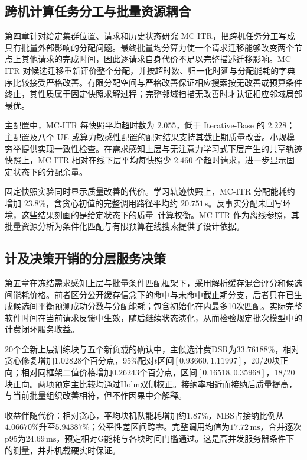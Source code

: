 \subsection{跨机计算任务分工与批量资源耦合}
\label{sec:ch6-snapshot-summary}

第四章针对给定集群位置、请求和历史状态研究 MC-ITR，把跨机任务分工写成具有批量外部影响的分配问题。最终批量均分算力使一个请求迁移能够改变两个节点上其他请求的完成时间，因此逐请求自身代价不足以完整描述迁移影响。MC-ITR 对候选迁移重新评价整个分配，并按超时数、归一化时延与分配能耗的字典序比较接受严格改善。有限分配空间与严格改善保证相应搜索按无改善或预算条件终止，其性质属于固定快照求解过程；完整邻域扫描无改善时才认证相应邻域局部最优。

主配置中，MC-ITR 每快照平均超时数为 $2.055$，低于 Iterative-Base 的 $2.228$；主配置及八个 UE 或算力敏感性配置的配对结果支持其截止期质量改善。小规模穷举提供实现一致性检查。在需求感知上层与无注意力学习式下层产生的共享轨迹快照上，MC-ITR 相对在线下层平均每快照少 $2.460$ 个超时请求，进一步显示固定状态下的分配余量。

固定快照实验同时显示质量改善的代价。学习轨迹快照上，MC-ITR 分配能耗约增加 $23.8\%$，含贪心初值的完整调用路径平均约 $20.751\,\mathrm{s}$。反事实分配未回写环境，这些结果刻画的是给定状态下的质量--计算权衡。MC-ITR 作为离线参照，其批量资源分析为条件化匹配与有限预算在线搜索提供了设计依据。

\subsection{计及决策开销的分层服务决策}
\label{sec:ch6-sfhlm-summary}
第五章在冻结需求感知上层与批量条件匹配框架下，采用解析缓存混合评分和候选间能耗价格。前者区分公开缓存信念下的命中与未命中截止期分支，后者只在已生成候选间平衡预测成功分数与分配能耗；包含初始化在内最多10次匹配。实际完整软件时间在当前请求反馈中生效，随后继续状态演化，从而检验规定批次模型中的计费闭环服务收益。

20个全新上层训练块与五个新负载的确认中，主候选计费DSR为$33.76188\%$，相对贪心修复增加$1.02828$个百分点，95\%配对$t$区间$[0.93660,1.11997]$，20/20块正向；相对同框架二值价格增加$0.26243$个百分点，区间$[0.16518,0.35968]$，18/20块正向。两项预定主比较均通过Holm双侧校正。接纳率相近而接纳后质量提高，与当前批量组织改善相符，但不作因果中介解释。

收益伴随代价：相对贪心，平均块机队能耗增加约$1.87\%$，MBS占接纳比例从$4.06670\%$升至$5.94387\%$；公平性差区间跨零。完整调用均值为$17.72\,\mathrm{ms}$，合并逐次p95为$24.69\,\mathrm{ms}$，预定相对G能耗与各块时间门槛通过。这是高并发服务器条件下的测量，并非机载硬实时保证。

